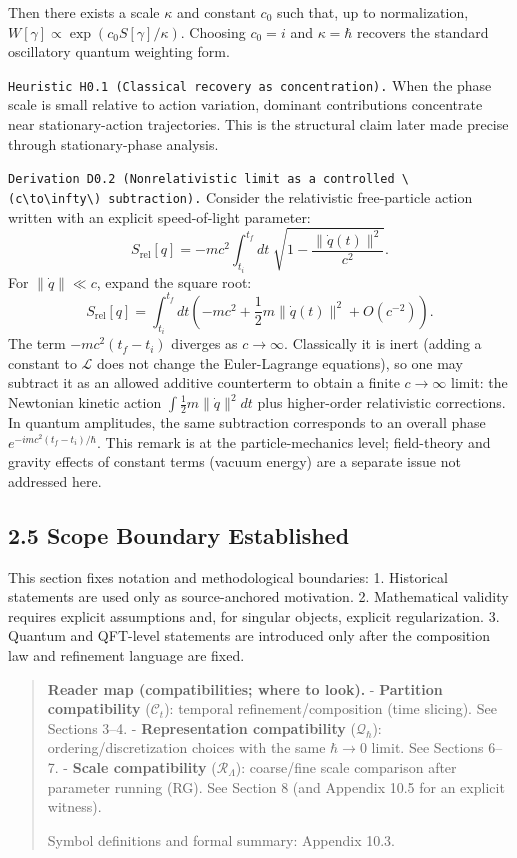 \documentclass[
]{article}
\begin{document}
Then there exists a scale \(\kappa\) and constant \(c_0\) such that, up
to normalization, \(W[\gamma]\propto \exp(c_0 S[\gamma]/\kappa)\).
Choosing \(c_0=i\) and \(\kappa=\hbar\) recovers the standard
oscillatory quantum weighting form.

\texttt{Heuristic\ H0.1\ (Classical\ recovery\ as\ concentration).} When
the phase scale is small relative to action variation, dominant
contributions concentrate near stationary-action trajectories. This is
the structural claim later made precise through stationary-phase
analysis.

\texttt{Derivation\ D0.2\ (Nonrelativistic\ limit\ as\ a\ controlled\ \textbackslash{}(c\textbackslash{}to\textbackslash{}infty\textbackslash{})\ subtraction).}
Consider the relativistic free-particle action written with an explicit
speed-of-light parameter: \[
S_{\mathrm{rel}}[q]
=-mc^2\int_{t_i}^{t_f} dt\;\sqrt{1-\frac{\|\dot q(t)\|^2}{c^2}}.
\] For \(\|\dot q\|\ll c\), expand the square root: \[
S_{\mathrm{rel}}[q]
=\int_{t_i}^{t_f} dt\left(-mc^2+\frac12 m\|\dot q(t)\|^2+O(c^{-2})\right).
\] The term \(-mc^2(t_f-t_i)\) diverges as \(c\to\infty\). Classically
it is inert (adding a constant to \(\mathcal L\) does not change the
Euler-Lagrange equations), so one may subtract it as an allowed additive
counterterm to obtain a finite \(c\to\infty\) limit: the Newtonian
kinetic action \(\int \frac12 m\|\dot q\|^2 dt\) plus higher-order
relativistic corrections. In quantum amplitudes, the same subtraction
corresponds to an overall phase \(e^{-imc^2(t_f-t_i)/\hbar}\). This
remark is at the particle-mechanics level; field-theory and gravity
effects of constant terms (vacuum energy) are a separate issue not
addressed here.

\subsection{2.5 Scope Boundary
Established}\label{scope-boundary-established}

This section fixes notation and methodological boundaries: 1. Historical
statements are used only as source-anchored motivation. 2. Mathematical
validity requires explicit assumptions and, for singular objects,
explicit regularization. 3. Quantum and QFT-level statements are
introduced only after the composition law and refinement language are
fixed.

\begin{quote}
\textbf{Reader map (compatibilities; where to look).} -
\textbf{Partition compatibility} (\(\mathcal C_t\)): temporal
refinement/composition (time slicing). See Sections 3--4. -
\textbf{Representation compatibility} (\(\mathcal Q_\hbar\)):
ordering/discretization choices with the same \(\hbar\to0\) limit. See
Sections 6--7. - \textbf{Scale compatibility} (\(\mathcal R_\Lambda\)):
coarse/fine scale comparison after parameter running (RG). See Section 8
(and Appendix 10.5 for an explicit witness).

Symbol definitions and formal summary: Appendix 10.3.
\end{quote}
\end{document}
